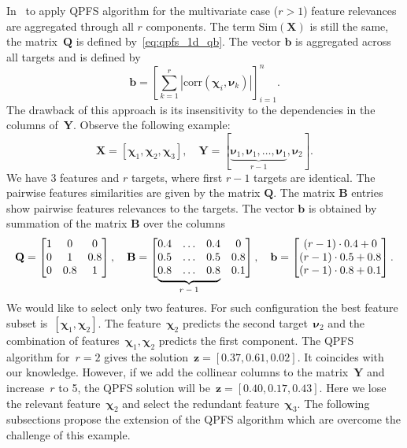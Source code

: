 \documentclass[12pt,twoside]{article}
\theoremstyle{definition}
\newcommand{\bz}{\mathbf{z}}
\newcommand{\bb}{\mathbf{b}}
\newcommand{\bY}{\mathbf{Y}}
\newcommand{\bX}{\mathbf{X}}
\newcommand{\bB}{\mathbf{B}}
\newcommand{\bQ}{\mathbf{Q}}
\newcommand{\bchi}{\boldsymbol{\chi}}
\newcommand{\bnu}{\boldsymbol{\nu}}
\newcommand\undermat[2]{%
	\makebox[0pt][l]{$\smash{\underbrace{\phantom{%
					\begin{matrix}#2\end{matrix}}}_{\text{$#1$}}}$}#2}
\begin{document}
In~\cite{motrenko2018multi} to apply QPFS algorithm for the multivariate case ($r > 1$) feature relevances are aggregated through all $r$ components. The term $\text{Sim}(\bX)$ is still the same, the matrix~$\bQ$ is defined by~\eqref{eq:qpfs_1d_qb}. The vector $\bb$ is aggregated across all targets and is defined by
\begin{equation*}
\bb = \left[\sum_{k=1}^r|\text{corr}(\bchi_i, \bnu_k)|\right]_{i=1}^n.
\end{equation*}
The drawback of this approach is its insensitivity to the dependencies in the columns of~$\bY$. Observe the following example:
\begin{equation*}
\bX = [\bchi_1, \bchi_2, \bchi_3], \quad \bY = [\underbrace{\bnu_1, \bnu_1, \dots, \bnu_1}_{r-1}, \bnu_2].
\end{equation*}
We have 3 features and $r$ targets, where first $r-1$ targets are identical.
The pairwise features similarities are given by the matrix $\bQ$.
The matrix $\bB$ entries show pairwise features relevances to the targets.
The vector $\bb$ is obtained by summation of the matrix $\bB$ over the columns
\begin{equation}
\bQ = \begin{bmatrix} 1 & 0 & 0\\ 0 & 1 & 0.8 \\ 0 & 0.8 & 1 \end{bmatrix}, \quad
\bB = \begin{bmatrix} 0.4 & \dots & 0.4 & 0 \\ 0.5 & \dots & 0.5 & 0.8 \\ \undermat{r-1}{0.8 & \dots & 0.8} & 0.1 \end{bmatrix}, \quad
\bb = \begin{bmatrix} (r-1) \cdot 0.4 + 0 \\ (r-1) \cdot 0.5 + 0.8 \\ (r-1) \cdot 0.8 + 0.1 \end{bmatrix}.
\label{eq:qpfs_example}
\end{equation}
\vspace{0.5cm} \\
We would like to select only two features.
For such configuration the best feature subset is~$[\bchi_1, \bchi_2]$.
The feature~$\bchi_2$ predicts the second target~$\bnu_2$ and the combination of features~$\bchi_1, \bchi_2$ predicts the first component.
The QPFS algorithm for~$r=2$ gives the solution~$\bz = [0.37,	0.61,	0.02]$. It coincides with our knowledge.
However, if we add the collinear columns to the matrix~$\bY$ and increase~$r$ to 5, the QPFS solution will be~$\bz = [0.40,	0.17, 0.43]$.
Here we lose the relevant feature~$\bchi_2$ and select the redundant feature~$\bchi_3$.
The following subsections propose the extension of the QPFS algorithm which are overcome the challenge of this example.
\end{document}
